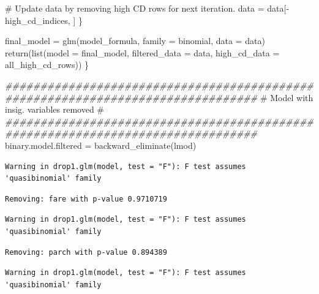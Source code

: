 \documentclass[
  letterpaper,
  DIV=11,
  numbers=noendperiod]{scrartcl}
\newenvironment{Shaded}{\begin{snugshade}}{\end{snugshade}}
\newcommand{\AttributeTok}[1]{\textcolor[rgb]{0.40,0.45,0.13}{#1}}
\newcommand{\CommentTok}[1]{\textcolor[rgb]{0.37,0.37,0.37}{#1}}
\newcommand{\DocumentationTok}[1]{\textcolor[rgb]{0.37,0.37,0.37}{\textit{#1}}}
\newcommand{\FunctionTok}[1]{\textcolor[rgb]{0.28,0.35,0.67}{#1}}
\newcommand{\NormalTok}[1]{\textcolor[rgb]{0.00,0.23,0.31}{#1}}
\newcommand{\OtherTok}[1]{\textcolor[rgb]{0.00,0.23,0.31}{#1}}
\newcommand{\SpecialCharTok}[1]{\textcolor[rgb]{0.37,0.37,0.37}{#1}}
\begin{document}
\begin{Shaded}
\begin{Highlighting}[]
    \CommentTok{\# Update data by removing high CD rows for next iteration.}
\NormalTok{    data }\OtherTok{=}\NormalTok{ data[}\SpecialCharTok{{-}}\NormalTok{high\_cd\_indices, ]}
\NormalTok{  \}}
  
\NormalTok{  final\_model }\OtherTok{=} \FunctionTok{glm}\NormalTok{(model\_formula, }\AttributeTok{family =}\NormalTok{ binomial, }\AttributeTok{data =}\NormalTok{ data)}
  \FunctionTok{return}\NormalTok{(}\FunctionTok{list}\NormalTok{(}\AttributeTok{model =}\NormalTok{ final\_model, }\AttributeTok{filtered\_data =}\NormalTok{ data, }\AttributeTok{high\_cd\_data =}\NormalTok{ all\_high\_cd\_rows))}
\NormalTok{\}}
\end{Highlighting}
\end{Shaded}

\begin{Shaded}
\begin{Highlighting}[]
\DocumentationTok{\#\#\#\#\#\#\#\#\#\#\#\#\#\#\#\#\#\#\#\#\#\#\#\#\#\#\#\#\#\#\#\#\#\#\#\#\#\#\#\#\#\#\#\#\#\#\#\#\#\#\#\#\#\#\#\#\#\#\#\#\#\#\#\#\#\#\#\#\#\#\#\#\#\#\#\#\#\#\#\#}
\CommentTok{\#                    Model with insig. variables removed                      \# }
\DocumentationTok{\#\#\#\#\#\#\#\#\#\#\#\#\#\#\#\#\#\#\#\#\#\#\#\#\#\#\#\#\#\#\#\#\#\#\#\#\#\#\#\#\#\#\#\#\#\#\#\#\#\#\#\#\#\#\#\#\#\#\#\#\#\#\#\#\#\#\#\#\#\#\#\#\#\#\#\#\#\#\#\#}
\NormalTok{binary.model.filtered }\OtherTok{=} \FunctionTok{backward\_eliminate}\NormalTok{(lmod)}
\end{Highlighting}
\end{Shaded}

\begin{verbatim}
Warning in drop1.glm(model, test = "F"): F test assumes 'quasibinomial' family
\end{verbatim}

\begin{verbatim}
Removing: fare with p-value 0.9710719 
\end{verbatim}

\begin{verbatim}
Warning in drop1.glm(model, test = "F"): F test assumes 'quasibinomial' family
\end{verbatim}

\begin{verbatim}
Removing: parch with p-value 0.894389 
\end{verbatim}

\begin{verbatim}
Warning in drop1.glm(model, test = "F"): F test assumes 'quasibinomial' family
\end{verbatim}
\end{document}
